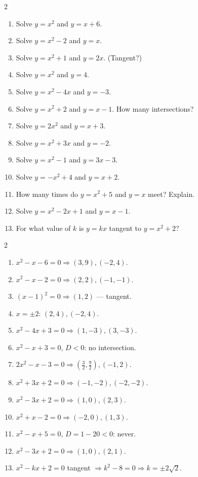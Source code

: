 \documentclass[11pt]{article}
\begin{document}
\clearpage
{}

\begin{recapbox}
\begin{multicols}{2}
\small
\begin{enumerate}[leftmargin=*,itemsep=3pt]
  \item Solve $y=x^2$ and $y=x+6$.
  \item Solve $y=x^2-2$ and $y=x$.
  \item Solve $y=x^2+1$ and $y=2x$. (Tangent?)
  \item Solve $y=x^2$ and $y=4$.
  \item Solve $y=x^2-4x$ and $y=-3$.
  \item Solve $y=x^2+2$ and $y=x-1$. How many intersections?
  \item Solve $y=2x^2$ and $y=x+3$.
  \item Solve $y=x^2+3x$ and $y=-2$.
  \item Solve $y=x^2-1$ and $y=3x-3$.
  \item Solve $y=-x^2+4$ and $y=x+2$.
  \item How many times do $y=x^2+5$ and $y=x$ meet? Explain.
  \item Solve $y=x^2-2x+1$ and $y=x-1$.
  \item For what value of $k$ is $y=kx$ tangent to $y=x^2+2$?
\end{enumerate}
\end{multicols}
\end{recapbox}

\begin{keybox}
\begin{multicols}{2}
\small
\begin{enumerate}[leftmargin=*,itemsep=3pt]
  \item $x^2-x-6=0\Rightarrow (3,9),(-2,4)$.
  \item $x^2-x-2=0\Rightarrow (2,2),(-1,-1)$.
  \item $(x-1)^2=0\Rightarrow (1,2)$ --- tangent.
  \item $x=\pm2$: $(2,4),(-2,4)$.
  \item $x^2-4x+3=0\Rightarrow (1,-3),(3,-3)$.
  \item $x^2-x+3=0$, $D<0$: no intersection.
  \item $2x^2-x-3=0\Rightarrow \left(\tfrac32,\tfrac92\right),(-1,2)$.
  \item $x^2+3x+2=0\Rightarrow (-1,-2),(-2,-2)$.
  \item $x^2-3x+2=0\Rightarrow (1,0),(2,3)$.
  \item $x^2+x-2=0\Rightarrow (-2,0),(1,3)$.
  \item $x^2-x+5=0$, $D=1-20<0$: never.
  \item $x^2-3x+2=0\Rightarrow (1,0),(2,1)$.
  \item $x^2-kx+2=0$ tangent $\Rightarrow k^2-8=0\Rightarrow k=\pm2\sqrt2$.
\end{enumerate}
\end{multicols}
\end{keybox}
\end{document}
